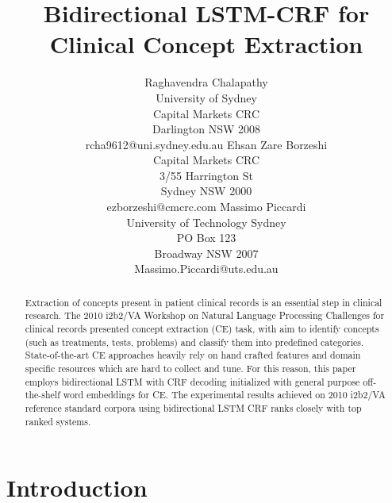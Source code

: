\documentclass[11pt]{article}
\title{Bidirectional LSTM-CRF for Clinical Concept Extraction}
\author{Raghavendra  Chalapathy \\ University of Sydney\\Capital Markets CRC\\
	Darlington NSW 2008 \\ rcha9612@uni.sydney.edu.au
	\And  
	Ehsan Zare Borzeshi  \\ Capital Markets CRC\\
	3/55 Harrington St \\Sydney NSW 2000 \\ ezborzeshi@cmcrc.com
	\And
	Massimo Piccardi \\University of Technology Sydney \\ PO Box 123 \\  Broadway NSW 2007 \\
	Massimo.Piccardi@uts.edu.au
}
\begin{document}
\maketitle
\begin{abstract}

Extraction of concepts present in patient clinical records is an essential step in clinical research. The 2010 i2b2/VA Workshop on Natural Language Processing Challenges for clinical records presented concept extraction (CE) task,  with aim to identify concepts (such as treatments, tests, problems) and classify them into predefined categories. State-of-the-art CE approaches heavily rely on hand crafted features and domain specific resources which are hard to collect and tune. For this reason, this paper employs bidirectional LSTM with CRF decoding   initialized with general purpose off-the-shelf word embeddings for  CE. The experimental results achieved on 2010 i2b2/VA reference standard corpora using bidirectional LSTM CRF ranks closely with  top ranked systems.

\end{abstract}

\section{Introduction}
\label{intro}
\end{document}
